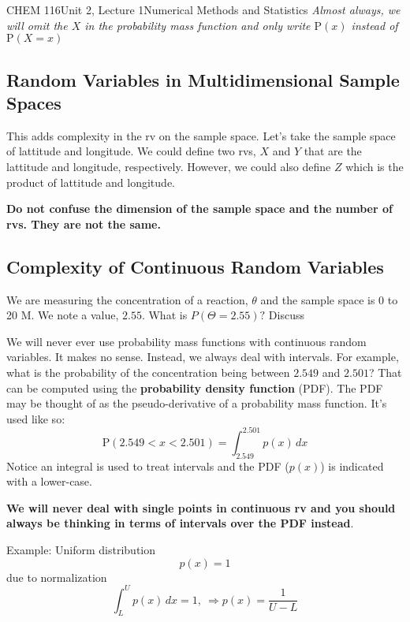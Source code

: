 \documentclass{article}
\renewcommand{\Pr}{\textrm{P}}
\begin{document}
\begin{tdoc}{CHEM 116}{Unit 2, Lecture 1}{Numerical Methods and Statistics}
\emph{Almost always, we will omit the $X$ in the probability mass
  function and only write $\Pr(x)$ instead of $\Pr(X=x)$}

\subsection{Random Variables in Multidimensional Sample Spaces}
This adds complexity in the rv on the sample space. Let's take the
sample space of lattitude and longitude. We could define two rvs, $X$
and $Y$ that are the lattitude and longitude, respectively. However,
we could also define $Z$ which is the product of lattitude and
longitude.

{\bf Do not confuse the dimension of the sample space and the number of rvs. They are not the same.}

\subsection{Complexity of Continuous Random Variables}
We are measuring the concentration of a reaction, $\theta$ and the
sample space is 0 to 20 M. We note a value, $2.55$. What is
$P(\Theta=2.55)?$ Discuss

We will never ever use probability mass functions with continuous
random variables. It makes no sense. Instead, we always deal with
intervals. For example, what is the probability of the concentration
being between $2.549$ and $2.501$? That can be computed using the {\bf
  probability density function} (PDF). The PDF may be thought of as
the pseudo-derivative of a probability mass function. It's used like so:
\[
\Pr(2.549 < x < 2.501) = \int_{2.549}^{2.501} p(x)\,dx
\]
Notice an integral is used to treat intervals and the PDF ($p(x)$) is
indicated with a lower-case.

{\bf We will never deal with single points in continuous rv and you
  should always be thinking in terms of intervals over the PDF
  instead}.

Example: Uniform distribution
\[
p(x) = 1
\]
due to normalization
\[
\int_L^U p(x) \,dx = 1,\:\Rightarrow p(x) = \frac{1}{U-L}
\]


\end{tdoc}
\end{document}
